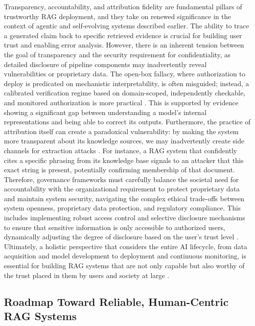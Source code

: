 \documentclass[11pt]{article}
\begin{document}
Transparency, accountability, and attribution fidelity are fundamental pillars of trustworthy RAG deployment, and they take on renewed significance in the context of agentic and self-evolving systems described earlier. The ability to trace a generated claim back to specific retrieved evidence is crucial for building user trust and enabling error analysis. However, there is an inherent tension between the goal of transparency and the security requirement for confidentiality, as detailed disclosure of pipeline components may inadvertently reveal vulnerabilities or proprietary data. The open-box fallacy, where authorization to deploy is predicated on mechanistic interpretability, is often misguided; instead, a calibrated verification regime based on domain-scoped, independently checkable, and monitored authorization is more practical \cite{ref623}. This is supported by evidence showing a significant gap between understanding a model's internal representations and being able to correct its outputs. Furthermore, the practice of attribution itself can create a paradoxical vulnerability: by making the system more transparent about its knowledge sources, we may inadvertently create side channels for extraction attacks \cite{ref624}. For instance, a RAG system that confidently cites a specific phrasing from its knowledge base signals to an attacker that this exact string is present, potentially confirming membership of that document. Therefore, governance frameworks must carefully balance the societal need for accountability with the organizational requirement to protect proprietary data and maintain system security, navigating the complex ethical trade-offs between system openness, proprietary data protection, and regulatory compliance. This includes implementing robust access control and selective disclosure mechanisms to ensure that sensitive information is only accessible to authorized users, dynamically adjusting the degree of disclosure based on the user's trust level \cite{ref618}. Ultimately, a holistic perspective that considers the entire AI lifecycle, from data acquisition and model development to deployment and continuous monitoring, is essential for building RAG systems that are not only capable but also worthy of the trust placed in them by users and society at large \cite{ref625}.

\subsection{Roadmap Toward Reliable, Human-Centric RAG Systems}
\end{document}
